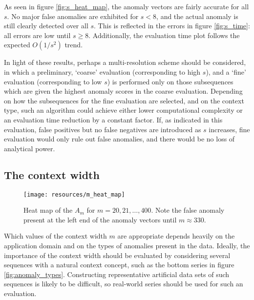 As seen in figure \ref{fig:s_heat_map}, the anomaly vectors are fairly accurate for all $s$. No major false anomalies are exhibited for $s < 8$, and the actual anomaly is still clearly detected over all $s$. This is reflected in the errors in figure \ref{fig:s_time}: all errors are low until $s \geq 8$. Additionally, the evaluation time plot follows the expected $O(1/s^2)$ trend.

In light of these results, perhaps a multi-resolution scheme should be considered, in which a preliminary, `coarse' evaluation (corresponding to high $s$), and a `fine' evaluation (corresponding to low $s$) is performed only on those subsequences which are given the highest anomaly scores in the coarse evaluation. Depending on how the subsequences for the fine evaluation are selected, and on the context type, such an algorithm could achieve either lower computational complexity or an evaluation time reduction by a constant factor. If, as indicated in this evaluation, false positives but no false negatives are introduced as $s$ increases, fine evaluation would only rule out false anomalies, and there would be no loss of analytical power. 

\subsection{The context width}
\FloatBarrier
\label{sect:m}

\begin{figure}[H]
    \vspace{-20pt}
    \begin{center}
        \texttt{[image: resources/m\_heat\_map]}
    \end{center}
    \vspace{-20pt}
    \caption{\small{Heat map of the $A_m$ for $m = 20, 21, \dots, 400$. Note the false anomaly present at the left end of the anomaly vectors until $m \approx 330$.}}
    \vspace{-10pt}
    \label{fig:m_heat_map}
\end{figure}

Which values of the context width $m$ are appropriate depends heavily on the application domain and on the types of anomalies present in the data. Ideally, the importance of the context width should be evaluated by considering several sequences with a natural context concept, such as the bottom series in figure \ref{fig:anomaly_types}. Constructing representative artificial data sets of such sequences is likely to be difficult, so real-world series should be used for such an evaluation.

